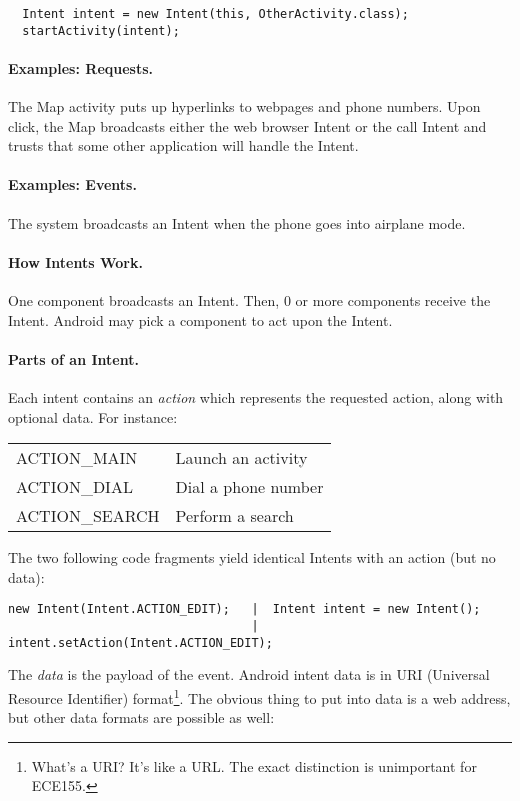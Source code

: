 {\small 
\begin{verbatim}
  Intent intent = new Intent(this, OtherActivity.class);
  startActivity(intent);
\end{verbatim}
}

\paragraph{Examples: Requests.} The Map activity puts up hyperlinks to webpages 
and phone numbers. Upon click, the Map broadcasts either the web browser
Intent or the call Intent and trusts that some other application will
handle the Intent.

\paragraph{Examples: Events.} The system broadcasts an Intent when the phone
goes into airplane mode.

\paragraph{How Intents Work.} One component broadcasts an Intent. Then, 
0 or more components receive the Intent. Android may pick a component
to act upon the Intent.

\paragraph{Parts of an Intent.} Each intent contains an \emph{action} which represents the requested
action, along with optional data. For instance:

\hspace*{2em} \begin{tabular}{ll}
ACTION\_MAIN & Launch an activity \\
ACTION\_DIAL & Dial a phone number \\
ACTION\_SEARCH & Perform a search
\end{tabular}

The two following code fragments yield identical Intents with an action (but no data):
{\small
\begin{verbatim}
new Intent(Intent.ACTION_EDIT);   |  Intent intent = new Intent();
                                  |  intent.setAction(Intent.ACTION_EDIT);
\end{verbatim}
}

The \emph{data} is the payload of the event. Android intent data is in
URI (Universal Resource Identifier) format\footnote{What's a URI? It's
  like a URL. The exact distinction is unimportant for ECE155.}. The
obvious thing to put into data is a web address, but other data formats
are possible as well:

